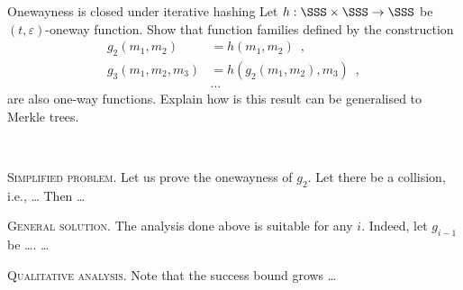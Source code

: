 \documentclass{crypto-exercise}
\author{Sven Laur}
\begin{document}
\begin{exercise}{Onewayness is closed under iterative hashing}
Let $h:\SSS\times\SSS\to\SSS$ be $(t,\varepsilon)$-oneway function. Show that function families defined by the construction
\begin{align*}
g_2(m_1, m_2) &= h(m_1,m_2)\enspace,\\
g_3(m_1, m_2, m_3)&=h(g_2(m_1, m_2), m_3)\enspace,\\
&\ldots
\end{align*}
are also one-way functions. Explain how is this result can be generalised to Merkle trees.

\end{exercise}
\begin{solution} 
\

\vspace*{2ex}
\noindent
\textsc{Simplified problem.}
Let us prove the onewayness of $g_2$. Let there be a collision, i.e., \ldots
Then \ldots 


\vspace*{2ex}
\noindent
\textsc{General solution.}
The analysis done above is suitable for any $i$. Indeed, let $g_{i-1}$ be \ldots. 
 \ldots


\vspace*{2ex}
\noindent
\textsc{Qualitative analysis.} Note that the success bound grows \ldots 

\end{solution}
\end{document}

